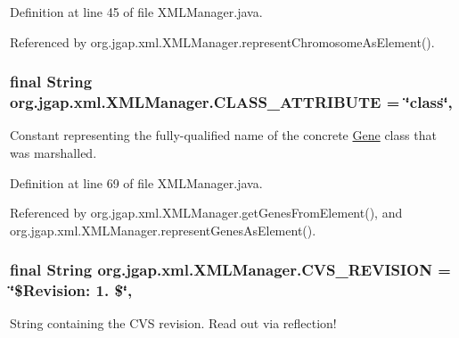 Definition at line 45 of file X\-M\-L\-Manager.\-java.



Referenced by org.\-jgap.\-xml.\-X\-M\-L\-Manager.\-represent\-Chromosome\-As\-Element().

\hypertarget{classorg_1_1jgap_1_1xml_1_1_x_m_l_manager_aa7b5673bbde0846b7f6a4a5ed087cdfc}{
\subsubsection[{C\-L\-A\-S\-S\-\_\-\-A\-T\-T\-R\-I\-B\-U\-T\-E}]{\setlength{\rightskip}{0pt plus 5cm}final String org.\-jgap.\-xml.\-X\-M\-L\-Manager.\-C\-L\-A\-S\-S\-\_\-\-A\-T\-T\-R\-I\-B\-U\-T\-E = \char`\"{}class\char`\"{}\hspace{0.3cm}{\ttfamily [static]}, {\ttfamily [private]}}}\label{classorg_1_1jgap_1_1xml_1_1_x_m_l_manager_aa7b5673bbde0846b7f6a4a5ed087cdfc}
Constant representing the fully-\/qualified name of the concrete \hyperlink{interfaceorg_1_1jgap_1_1_gene}{Gene} class that was marshalled. 

Definition at line 69 of file X\-M\-L\-Manager.\-java.



Referenced by org.\-jgap.\-xml.\-X\-M\-L\-Manager.\-get\-Genes\-From\-Element(), and org.\-jgap.\-xml.\-X\-M\-L\-Manager.\-represent\-Genes\-As\-Element().

\hypertarget{classorg_1_1jgap_1_1xml_1_1_x_m_l_manager_a472779c969fd8ec16084c56ef5f1397f}{
\subsubsection[{C\-V\-S\-\_\-\-R\-E\-V\-I\-S\-I\-O\-N}]{\setlength{\rightskip}{0pt plus 5cm}final String org.\-jgap.\-xml.\-X\-M\-L\-Manager.\-C\-V\-S\-\_\-\-R\-E\-V\-I\-S\-I\-O\-N = \char`\"{}\$Revision\-: 1. \$\char`\"{}\hspace{0.3cm}{\ttfamily [static]}, {\ttfamily [private]}}}\label{classorg_1_1jgap_1_1xml_1_1_x_m_l_manager_a472779c969fd8ec16084c56ef5f1397f}
String containing the C\-V\-S revision. Read out via reflection! 

